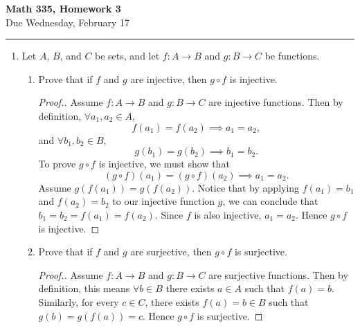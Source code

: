 \documentclass[11pt,twoside]{article}
\begin{document}
\begin{center}
{\bf \Large Math 335, Homework 3}\\
\vspace{0.1in}
{\Large Due Wednesday, February 17}
\vspace{0.1cm}
\end{center}

\hrule

\vspace{.2in}

\begin{enumerate}

\item Let $A$, $B$, and $C$ be sets, and let $f: A \rightarrow B$ and $g: B \rightarrow C$ be functions.

\begin{enumerate}[label=(\alph*)]
\item Prove that if $f$ and $g$ are injective, then $g \circ f$ is injective.

\begin{proof}[\color{red}Proof.]
Assume $f\colon A\to B$ and $g\colon B \to C$ are injective functions.  Then by definition, $\forall a_1, a_2 \in A$,
\[ f(a_1) = f(a_2) \implies a_1 = a_2, \]
and $\forall b_1, b_2 \in B$,
\[ g(b_1) = g(b_2) \implies b_1 = b_2. \]
To prove $g \circ f$ is injective, we must show that
\[ (g\circ f)(a_1) = (g\circ f)(a_2) \implies a_1 = a_2. \]
Assume $g(f(a_1)) = g(f(a_2))$.  Notice that by applying $f(a_1) = b_1$ and $f(a_2) = b_2$ to our injective function $g$, we can conclude that $b_1 = b_2 = f(a_1) = f(a_2)$.  Since $f$ is also injective, $a_1 = a_2$.  Hence $g\circ f$ is injective.
\end{proof}

\item Prove that if $f$ and $g$ are surjective, then $g \circ f$ is surjective.

\begin{proof}[\color{red}Proof.]
Assume $f\colon A\to B$ and $g\colon B \to C$ are surjective functions.  Then by definition, this means $\forall b\in B$ there exists $a\in A$ such that $f(a) = b$.  Similarly, for every $c\in C$, there exists $f(a)=b\in B$ such that $g(b) = g(f(a)) = c$.  Hence $g\circ f$ is surjective.
\end{proof}

\end{enumerate}

\vspace{0.5cm}


\end{enumerate}
\end{document}
